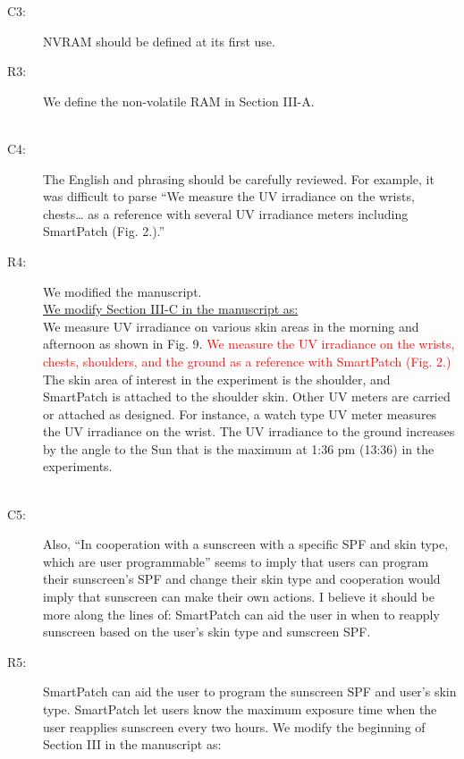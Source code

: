 \documentclass[onecolumn]{IEEEconf}
\begin{document}
\begin{description}
\item [C3: ] NVRAM should be defined at its first use.
\item [R3: ] We define the non-volatile RAM in Section III-A.\\
~\\

\item [C4:] The English and phrasing should be carefully reviewed. For example, it was difficult to parse ``We measure the UV irradiance on the wrists, chests… as a reference with several UV irradiance meters including SmartPatch (Fig. 2.).'' 

\item [R4: ] We modified the manuscript. \\

\underline{We modify Section III-C in the manuscript as:}\\
We measure UV irradiance on various skin areas in the morning and afternoon as shown in Fig. 9. \textcolor{red}{We measure the UV irradiance on the wrists, chests, shoulders, and the ground as a reference with SmartPatch (Fig. 2.)} The skin area of interest in the experiment is the shoulder, and SmartPatch is attached to the shoulder skin. Other UV meters are carried or attached as designed. For instance, a watch type UV meter measures the UV irradiance on the wrist. The UV irradiance to the ground increases by the angle to the Sun that is the maximum at 1:36 pm (13:36) in the experiments.\\
~\\

\item [C5:] Also, ``In cooperation with a sunscreen with a specific SPF and skin type, which are user programmable'' seems to imply that users can program their sunscreen's SPF and change their skin type and cooperation would imply that sunscreen can make their own actions. I believe it should be more along the lines of: SmartPatch can aid the user in when to reapply sunscreen based on the user's skin type and sunscreen SPF.

\item [R5: ] SmartPatch can aid the user to program the sunscreen SPF and user's skin type. SmartPatch let users know the maximum exposure time when the user reapplies sunscreen every two hours. We modify the beginning of Section III in the manuscript as:


\end{description}
\end{document}
